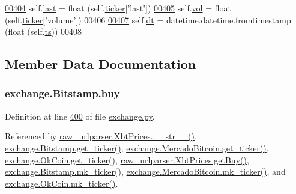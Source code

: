 \begin{DoxyCode}
\hypertarget{classexchange_1_1_bitstamp.tex_l00404}{}\hyperlink{classexchange_1_1_bitstamp_acf669ec9b8b50638dc19dec5fd40ab04}{00404}         self.\hyperlink{classexchange_1_1_bitstamp_acf669ec9b8b50638dc19dec5fd40ab04}{last} = float (self.\hyperlink{classexchange_1_1_exchange_a7cf9e52f993627955a2e242c388daaeb}{ticker}[\textcolor{stringliteral}{'last'}])
\hypertarget{classexchange_1_1_bitstamp.tex_l00405}{}\hyperlink{classexchange_1_1_bitstamp_a4ddf3680f552a7d634b3bbea809cc606}{00405}         self.\hyperlink{classexchange_1_1_bitstamp_a4ddf3680f552a7d634b3bbea809cc606}{vol}  = float (self.\hyperlink{classexchange_1_1_exchange_a7cf9e52f993627955a2e242c388daaeb}{ticker}[\textcolor{stringliteral}{'volume'}])
00406     
\hypertarget{classexchange_1_1_bitstamp.tex_l00407}{}\hyperlink{classexchange_1_1_bitstamp_a527b7d7c5814118b5adfdaf0b960f036}{00407}         self.\hyperlink{classexchange_1_1_bitstamp_a527b7d7c5814118b5adfdaf0b960f036}{dt} = datetime.datetime.fromtimestamp (float (self.\hyperlink{classexchange_1_1_bitstamp_a8e85011dca7c70ffd1ed5ed398b0ed34}{ts}))
00408     
\end{DoxyCode}


\subsection{Member Data Documentation}
\subsubsection[{\texorpdfstring{buy}{buy}}]{\setlength{\rightskip}{0pt plus 5cm}exchange.\+Bitstamp.\+buy}\hypertarget{classexchange_1_1_bitstamp_a40aa1ff3335ef4c80a5107234e05e23e}{}\label{classexchange_1_1_bitstamp_a40aa1ff3335ef4c80a5107234e05e23e}


Definition at line \hyperlink{exchange_8py_source_l00400}{400} of file \hyperlink{exchange_8py_source}{exchange.\+py}.



Referenced by \hyperlink{raw__urlparser_8py_source_l00074}{raw\+\_\+urlparser.\+Xbt\+Prices.\+\_\+\+\_\+str\+\_\+\+\_\+()}, \hyperlink{exchange_8py_source_l00409}{exchange.\+Bitstamp.\+get\+\_\+ticker()}, \hyperlink{exchange_8py_source_l00543}{exchange.\+Mercado\+Bitcoin.\+get\+\_\+ticker()}, \hyperlink{exchange_8py_source_l00608}{exchange.\+Ok\+Coin.\+get\+\_\+ticker()}, \hyperlink{raw__urlparser_8py_source_l00062}{raw\+\_\+urlparser.\+Xbt\+Prices.\+get\+Buy()}, \hyperlink{exchange_8py_source_l00423}{exchange.\+Bitstamp.\+mk\+\_\+ticker()}, \hyperlink{exchange_8py_source_l00557}{exchange.\+Mercado\+Bitcoin.\+mk\+\_\+ticker()}, and \hyperlink{exchange_8py_source_l00622}{exchange.\+Ok\+Coin.\+mk\+\_\+ticker()}.

